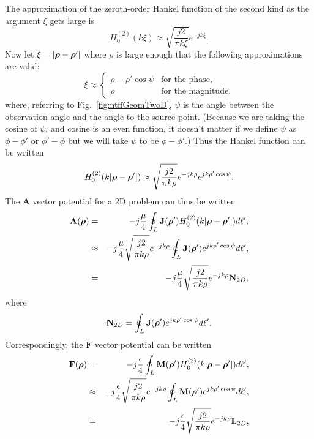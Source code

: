 The approximation of the zeroth-order Hankel function of the second
kind as the argument $\xi$ gets large is
\begin{equation}
  H_0^{(2)}(k\xi) \approx \sqrt{\frac{j 2}{\pi k\xi}}e^{-jk\xi}.
\end{equation}
Now let $\xi=|\boldsymbol{\rho} - \boldsymbol{\rho}'|$ where $\rho$ is large
enough that the following approximations are valid:
\begin{equation}
 \xi \approx \left\{
  \begin{array}{ll}
    \rho-\rho'\cos\psi & \mbox{for the phase}, \\
    \rho               & \mbox{for the magnitude}.
  \end{array}\right.
\end{equation}
where, referring to Fig.\ \ref{fig:ntffGeomTwoD}, $\psi$ is the angle
between the observation angle and the angle to the source point.
(Because we are taking the cosine of $\psi$, and cosine is an even
function, it doesn't matter if we define $\psi$ as $\phi-\phi'$ or
$\phi'-\phi$ but we will take $\psi$ to be $\phi - \phi'$.)  Thus the
Hankel function can be written
\begin{equation}
  H_0^{(2)}(k|\boldsymbol{\rho} - \boldsymbol{\rho}'|) \approx
      \sqrt{\frac{j 2}{\pi k\rho}}e^{-jk\rho}e^{jk\rho'\cos\psi}.
\end{equation}
The $\mathbf{A}$ vector potential for a 2D problem can thus be written
\begin{eqnarray}
  \mathbf{A}(\boldsymbol{\rho}) &=&
    -j\frac{\mu}{4}\oint_L \mathbf{J}(\boldsymbol{\rho}')
                           H_0^{(2)}(k|\boldsymbol{\rho} - \boldsymbol{\rho}'|)d\ell', \\
  &\approx&
    -j\frac{\mu}{4}\sqrt{\frac{j 2}{\pi k\rho}}e^{-jk\rho}
                   \oint_L \mathbf{J}(\boldsymbol{\rho}')
                          e^{jk\rho'\cos\psi} d\ell', \\
  &=&
    -j\frac{\mu}{4}\sqrt{\frac{j 2}{\pi k\rho}}e^{-jk\rho}
                   \mathbf{N}_{2D},
   \label{eq:afar}
\end{eqnarray}
where
\begin{equation}
  \mathbf{N}_{2D} = 
    \oint_L \mathbf{J}(\boldsymbol{\rho}') e^{jk\rho'\cos\psi} d\ell'.
\end{equation}
Correspondingly, the $\mathbf{F}$ vector potential can be written
\begin{eqnarray}
  \mathbf{F}(\boldsymbol{\rho}) &=&
    -j\frac{\epsilon}{4}\oint_L \mathbf{M}(\boldsymbol{\rho}')
                           H_0^{(2)}(k|\boldsymbol{\rho} - \boldsymbol{\rho}'|)d\ell', \\
  &\approx&
    -j\frac{\epsilon}{4}\sqrt{\frac{j 2}{\pi k\rho}}e^{-jk\rho}
                   \oint_L \mathbf{M}(\boldsymbol{\rho}')
                          e^{jk\rho'\cos\psi} d\ell', \\
  &=&
    -j\frac{\epsilon}{4}\sqrt{\frac{j 2}{\pi k\rho}}e^{-jk\rho}
                   \mathbf{L}_{2D},
   \label{eq:ffar}
\end{eqnarray}

